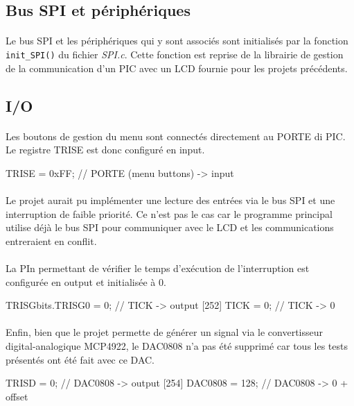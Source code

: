 \documentclass{article}
\begin{document}
    \subsection{Bus SPI et périphériques}
    \paragraph{}
    Le bus SPI et les périphériques qui y sont associés sont initialisés par la fonction \texttt{init\_SPI()} du fichier \emph{SPI.c}. Cette fonction est reprise de la librairie de gestion de la communication d'un PIC avec un LCD fournie pour les projets précédents.

    \subsection{I/O}
    \paragraph{}
    Les boutons de gestion du menu sont connectés directement au PORTE di PIC. Le registre TRISE est donc configuré en input.
    \begin{verbatimtab}
    [250]    TRISE   = 0xFF;         // PORTE (menu buttons) -> input
    \end{verbatimtab}

    \paragraph{}
    Le projet aurait pu implémenter une lecture des entrées via le bus SPI et une interruption de faible priorité. Ce n'est pas le cas car le programme principal utilise déjà le bus SPI pour communiquer avec le LCD et les communications entreraient en conflit.

    \paragraph{}
    La PIn permettant de vérifier le temps d'exécution de l'interruption est configurée en output et initialisée à 0.
    \begin{verbatimtab}
    [251]    TRISGbits.TRISG0 = 0;   // TICK -> output
    [252]    TICK    = 0;            // TICK -> 0
    \end{verbatimtab}

    \paragraph{}
    Enfin, bien que le projet permette de générer un signal via le convertisseur digital-analogique MCP4922, le DAC0808 n'a pas été supprimé car tous les tests présentés ont été fait avec ce DAC.
    \begin{verbatimtab}
    [253]    TRISD   = 0;            // DAC0808 -> output
    [254]    DAC0808 = 128;          // DAC0808 -> 0 + offset
    \end{verbatimtab}
\end{document}

